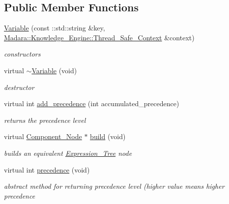 \subsection*{Public Member Functions}
\begin{DoxyCompactItemize}
\item 
\hyperlink{classMadara_1_1Expression__Tree_1_1Variable_a344f3f04b66474bca1ca5fb2f4686bd0}{Variable} (const ::std::string \&key, \hyperlink{classMadara_1_1Knowledge__Engine_1_1Thread__Safe__Context}{Madara::Knowledge\_\-Engine::Thread\_\-Safe\_\-Context} \&context)
\begin{DoxyCompactList}\small\item\em constructors \item\end{DoxyCompactList}\item 
virtual \hyperlink{classMadara_1_1Expression__Tree_1_1Variable_a0698b620b5b0fae2255bce64664e584f}{$\sim$Variable} (void)
\begin{DoxyCompactList}\small\item\em destructor \item\end{DoxyCompactList}\item 
virtual int \hyperlink{classMadara_1_1Expression__Tree_1_1Variable_ac33bf9452571b6aa2a27799f801c3abf}{add\_\-precedence} (int accumulated\_\-precedence)
\begin{DoxyCompactList}\small\item\em returns the precedence level \item\end{DoxyCompactList}\item 
virtual \hyperlink{classMadara_1_1Expression__Tree_1_1Component__Node}{Component\_\-Node} $\ast$ \hyperlink{classMadara_1_1Expression__Tree_1_1Variable_a031ac3899ab8efb759543a3ed6edacdb}{build} (void)
\begin{DoxyCompactList}\small\item\em builds an equivalent \hyperlink{classMadara_1_1Expression__Tree_1_1Expression__Tree}{Expression\_\-Tree} node \item\end{DoxyCompactList}\item 
virtual int \hyperlink{classMadara_1_1Expression__Tree_1_1Symbol_ac060dedb8d16864591b259df375109b3}{precedence} (void)
\begin{DoxyCompactList}\small\item\em abstract method for returning precedence level (higher value means higher precedence \item\end{DoxyCompactList}\end{DoxyCompactItemize}
